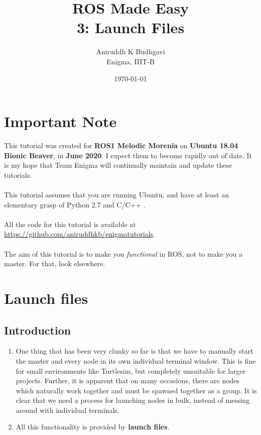 \documentclass{article}
\title{ROS Made Easy \\3: Launch Files}
\date{\today}
\author{Aniruddh K Budhgavi \\Enigma, IIIT-B}
\begin{document}
    \maketitle
    \section{Important Note}
    This tutorial was created for \textbf{ROS1 Melodic Morenia}
    on \textbf{Ubuntu 18.04 Bionic Beaver}, in \textbf{June 2020}.
    I expect them to become rapidly out of date. It is my hope
    that Team Enigma will continually maintain and update these tutorials.
    \\
    \\
    This tutorial assumes that you are running Ubuntu, and have at least an
    elementary grasp of Python 2.7 and C/C++ .
    \\
    \\
    All the code for this tutorial is available at \url{https://github.com/aniruddhkb/enigmatutorials}.
    \\
    \\
    The aim of this tutorial is to make you \emph{functional} in ROS, not to make you a master. For 
    that, look elsewhere.
    \section{Launch files}
        \subsection{Introduction}
        \begin{enumerate}
            \item One thing that has been very clunky so far is that we have to manually start 
            the master and every node in its own individual terminal window. This is fine for 
            small environments like Turtlesim, but completely unsuitable for larger projects.
            Further, it is apparent that on many occasions, there are nodes which naturally work
            together and must be spawned together as a group. It is clear that we need a process 
            for launching nodes in bulk, instead of messing around with individual terminals.

            \item All this functionality is provided by \textbf{launch files}.
        \end{enumerate}
\end{document}
